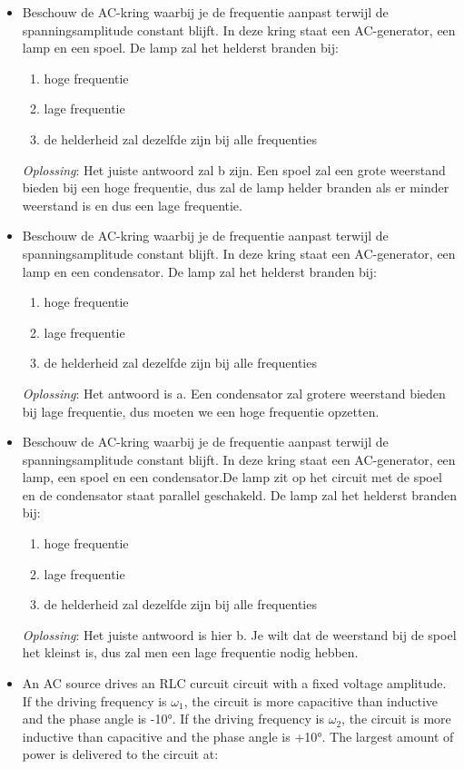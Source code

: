 \documentclass[12pt,a4paper]{article}
\begin{document}
\begin{itemize}
    	\item Beschouw de AC-kring waarbij je de frequentie aanpast terwijl de spanningsamplitude constant blijft. In deze kring staat een AC-generator, een lamp en een spoel. De lamp zal het helderst branden bij: 
    	\begin{enumerate}[label=\alph*]
    		\item hoge frequentie
    		\item lage frequentie
    		\item de helderheid zal dezelfde zijn bij alle frequenties
    	\end{enumerate}
    	\textit{Oplossing}: Het juiste antwoord zal b zijn. Een spoel zal een grote weerstand bieden bij een hoge frequentie, dus zal de lamp helder branden als er minder weerstand is en dus een lage frequentie.
    	\item Beschouw de AC-kring waarbij je de frequentie aanpast terwijl de spanningsamplitude constant blijft. In deze kring staat een AC-generator, een lamp en een condensator. De lamp zal het helderst branden bij:
    	\begin{enumerate}[label=\alph*]
    		\item hoge frequentie
    		\item lage frequentie
    		\item de helderheid zal dezelfde zijn bij alle frequenties
    	\end{enumerate}
    	\textit{Oplossing}: Het antwoord is a. Een condensator zal grotere weerstand bieden bij lage frequentie, dus moeten we een hoge frequentie opzetten. 
    	\item Beschouw de AC-kring waarbij je de frequentie aanpast terwijl de spanningsamplitude constant blijft. In deze kring staat een AC-generator, een lamp, een spoel en een condensator.De lamp zit op het circuit met de spoel en de condensator staat parallel geschakeld. De lamp zal het helderst branden bij:
    	\begin{enumerate}[label=\alph*]
    		\item hoge frequentie
    		\item lage frequentie
    		\item de helderheid zal dezelfde zijn bij alle frequenties
    	\end{enumerate}
    	\textit{Oplossing}: Het juiste antwoord is hier b. Je wilt dat de weerstand bij de spoel het kleinst is, dus zal men een lage frequentie nodig hebben. 
    	\item An AC source drives an RLC curcuit circuit with a fixed voltage amplitude. If the driving frequency is $\omega_1$, the circuit is more capacitive than inductive and the phase angle is -10°. If the driving frequency is $\omega_2$, the circuit is more inductive than capacitive and the phase angle is +10°. The largest amount of power is delivered to the circuit at: 

\end{itemize}
\end{document}
